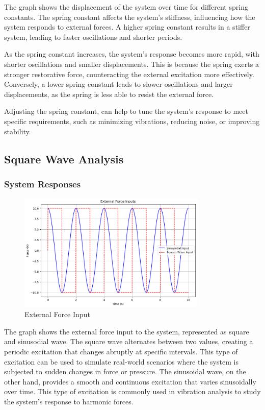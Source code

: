 \documentclass[12pt,a4paper]{article}
\begin{document}
The graph shows the displacement of the system over time for different spring constants. The spring constant affects the system's stiffness, influencing how the system responds to external forces. A higher spring constant results in a stiffer system, leading to faster oscillations and shorter periods.

As the spring constant increases, the system's response becomes more rapid, with shorter oscillations and smaller displacements. This is because the spring exerts a stronger restorative force, counteracting the external excitation more effectively. Conversely, a lower spring constant leads to slower oscillations and larger displacements, as the spring is less able to resist the external force.

Adjusting the spring constant, can help to tune the system's response to meet specific requirements, such as minimizing vibrations, reducing noise, or improving stability.

{\vspace{10pt}}


\subsection{Square Wave Analysis}
\subsubsection{System Responses}
\begin{figure}[H]
    \centering
    \includegraphics[width=0.8\textwidth]{force_input.png} 
    \caption{External Force Input}
    \label{fig:system}
\end{figure}
{\vspace{10pt}}

The graph shows the external force input to the system, represented as square and sinusodial wave. The square wave alternates between two values, creating a periodic excitation that changes abruptly at specific intervals. This type of excitation can be used to simulate real-world scenarios where the system is subjected to sudden changes in force or pressure. The sinusoidal wave, on the other hand, provides a smooth and continuous excitation that varies sinusoidally over time. This type of excitation is commonly used in vibration analysis to study the system's response to harmonic forces.
\end{document}
